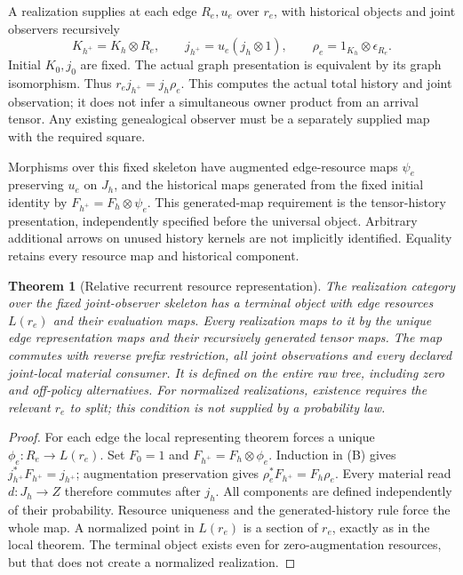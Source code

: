 \documentclass{article}
\newtheorem{theorem}{Theorem}\newtheorem{proposition}{Proposition}
\begin{document}
A realization supplies at each edge $R_e,u_e$ over $r_e$, with historical objects and joint observers recursively
\[
 K_{h^+}=K_h\otimes R_e,\qquad
 j_{h^+}=u_e(j_h\otimes1),\qquad
 \rho_e=1_{K_h}\otimes\epsilon_{R_e}.
\tag{B}
\]
Initial $K_0,j_0$ are fixed. The actual graph presentation is equivalent by its graph isomorphism. Thus $r_ej_{h^+}=j_h\rho_e$. This computes the actual total history and joint observation; it does not infer a simultaneous owner product from an arrival tensor. Any existing genealogical observer must be a separately supplied map with the required square.

Morphisms over this fixed skeleton have augmented edge-resource maps $\psi_e$ preserving $u_e$ on $J_h$, and the historical maps generated from the fixed initial identity by $F_{h^+}=F_h\otimes\psi_e$. This generated-map requirement is the tensor-history presentation, independently specified before the universal object. Arbitrary additional arrows on unused history kernels are not implicitly identified. Equality retains every resource map and historical component.

\begin{theorem}[Relative recurrent resource representation]
The realization category over the fixed joint-observer skeleton has a terminal object with edge resources $L(r_e)$ and their evaluation maps. Every realization maps to it by the unique edge representation maps and their recursively generated tensor maps. The map commutes with reverse prefix restriction, all joint observations and every declared joint-local material consumer. It is defined on the entire raw tree, including zero and off-policy alternatives. For normalized realizations, existence requires the relevant $r_e$ to split; this condition is not supplied by a probability law.
\end{theorem}
\begin{proof}
For each edge the local representing theorem forces a unique $\phi_e:R_e\to L(r_e)$. Set $F_0=1$ and $F_{h^+}=F_h\otimes\phi_e$. Induction in (B) gives $j^*_{h^+}F_{h^+}=j_{h^+}$; augmentation preservation gives $\rho^*_e F_{h^+}=F_h\rho_e$. Every material read $d:J_h\to Z$ therefore commutes after $j_h$. All components are defined independently of their probability. Resource uniqueness and the generated-history rule force the whole map. A normalized point in $L(r_e)$ is a section of $r_e$, exactly as in the local theorem. The terminal object exists even for zero-augmentation resources, but that does not create a normalized realization.\end{proof}
\end{document}
